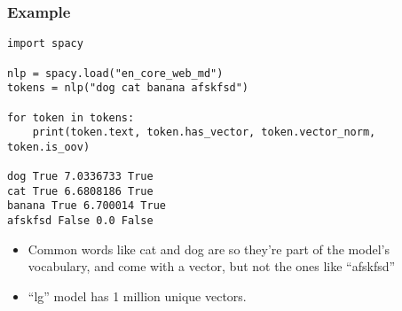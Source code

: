 \begin{frame}[fragile]\frametitle{Example}

\begin{lstlisting}
import spacy

nlp = spacy.load("en_core_web_md")
tokens = nlp("dog cat banana afskfsd")

for token in tokens:
    print(token.text, token.has_vector, token.vector_norm, token.is_oov)
		
dog True 7.0336733 True
cat True 6.6808186 True
banana True 6.700014 True
afskfsd False 0.0 False
\end{lstlisting}

\begin{itemize}
\item Common words like cat and dog are so they’re part of the model’s vocabulary, and come with a vector, but not the ones like ``afskfsd''
\item ``lg'' model has 1 million unique vectors.
\end{itemize}
\end{frame}

